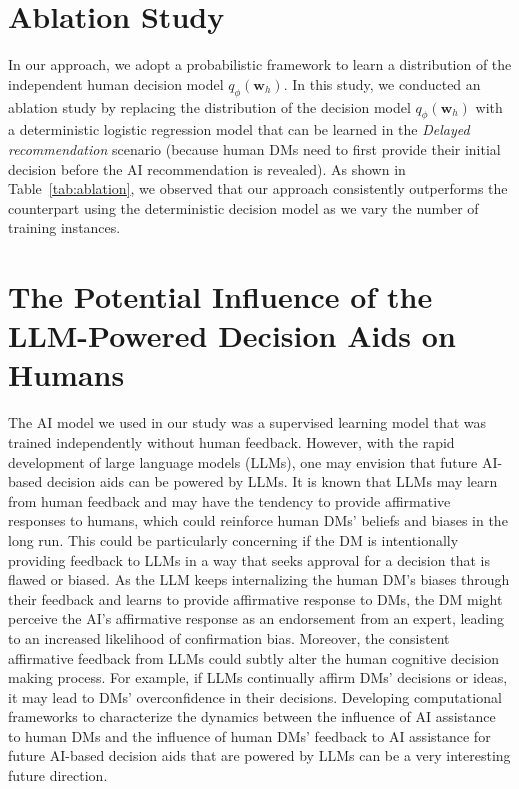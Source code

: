 \documentclass[letterpaper]{article} %
\newcommand{\my}[1]{\textcolor{blue}{[Ming: #1]}}
\begin{document}
\section{Ablation Study}
In our approach, we adopt a probabilistic framework to learn a distribution of the independent human decision model $q_{\phi}(\bm{w}_h)$. In this study, we conducted an ablation study by replacing the distribution of the decision model $q_{\phi}(\bm{w}_h)$ with a deterministic logistic regression model that can be learned in the \emph{Delayed recommendation} scenario (because human DMs need to first provide their initial decision before the AI recommendation is revealed). %
As shown in Table~\ref{tab:ablation}, we observed that our approach consistently outperforms the counterpart using the deterministic decision model as we vary the number of training instances.

\section{The Potential Influence of the LLM-Powered Decision Aids on Humans}
The AI model we used in our study was a supervised learning model that was trained independently without human feedback. However, with the rapid development of large language models (LLMs), one may envision that future AI-based decision aids can be powered by LLMs. It is known that LLMs may learn from human feedback and may have the tendency to
provide affirmative responses to humans, which could reinforce human DMs' beliefs and biases in the long run. %
This could be particularly concerning if the DM is intentionally providing feedback to LLMs in a way that seeks approval for a decision that is flawed or biased. As the LLM keeps internalizing the human DM's biases through their feedback and learns to provide affirmative response to DMs, the DM might perceive the AI's affirmative response as an endorsement from an expert, leading to an increased likelihood of confirmation bias. Moreover, the consistent affirmative feedback from LLMs could subtly alter the human cognitive decision making process. For example, if LLMs continually affirm DMs' decisions or ideas, it may lead to DMs' overconfidence in their decisions. Developing computational frameworks to characterize the dynamics between the influence of AI assistance to human DMs and the influence of human DMs' feedback to AI assistance for future AI-based decision aids that are powered by LLMs can be a very interesting future direction.
\end{document}
